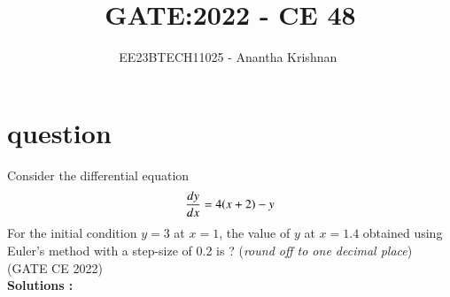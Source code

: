 \documentclass[journal,12pt,onecolumn]{IEEEtran}
\theoremstyle{remark}
\begin{document}

\vspace{3cm}

\title{GATE:2022 - CE 48 }
\author{EE23BTECH11025 - Anantha Krishnan $^{}$%
}
\maketitle
\bigskip



\section{question}

Consider the differential equation
\begin{align}
    \frac{dy}{dx} = 4(x+2) - y \notag
\end{align}
For the initial condition $y = 3$ at $x = 1$, the value of $y$ at $x = 1.4$ obtained using Euler's method with a step-size of 0.2 is ? (\textit{round off to one decimal place})
\hfill{(GATE CE 2022)}\\
 



\textbf{Solutions :}

\end{document}
